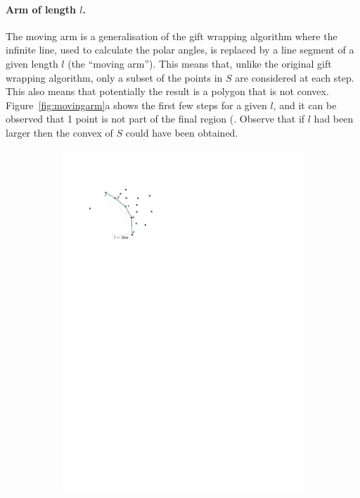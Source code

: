 \paragraph{Arm of length $l$.} 
The moving arm is a generalisation of the gift wrapping algorithm where the infinite line, used to calculate the polar angles, is replaced by a line segment of a given length $l$ (the ``moving arm'').
This means that, unlike the original gift wrapping algorithm, only a subset of the points in $S$ are considered at each step.
This also means that potentially the result is a polygon that is not convex.
Figure~\ref{fig:movingarm}a shows the first few steps for a given $l$, and it can be observed that 1 point is not part of the final region (.
Observe that if $l$ had been larger then the convex of $S$ could have been obtained.
\begin{figure}
  \centering
  \begin{subfigure}[b]{0.3\linewidth}
    \centering
    \includegraphics[page=1,width=\textwidth]{figs/movingarm.pdf}

\end{subfigure}
\end{figure}
